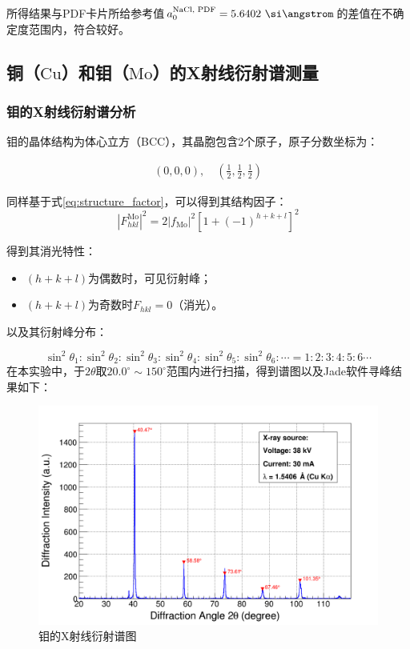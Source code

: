 \documentclass{thuemp}
\begin{document}
所得结果与PDF卡片所给参考值$a_0^{\text{NaCl, PDF}} = 5.6402~\text{\si\angstrom}$的差值在不确定度范围内，符合较好。

\subsection{铜（$\text{Cu}$）和钼（$\text{Mo}$）的X射线衍射谱测量}

\subsubsection{钼的X射线衍射谱分析}

钼的晶体结构为体心立方（BCC），其晶胞包含2个原子，原子分数坐标为：

\begin{align*}
(0,0,0),\quad \left(\frac{1}{2},\frac{1}{2},\frac{1}{2}\right)
\end{align*}

同样基于式\ref{eq:structure_factor}，可以得到其结构因子：
\begin{equation}
    |F_{hkl}^{\text{Mo}}|^2 = 2|f_{\text{Mo}}|^2 \left[1+(-1)^{h+k+l}\right]^2
    \label{eq:mo_struct_fac}
\end{equation}

得到其消光特性：

\begin{itemize}
    \item $(h+k+l)$为偶数时，可见衍射峰；
    \item $(h+k+l)$为奇数时$F_{hkl}=0$（消光）。
\end{itemize}

以及其衍射峰分布：

\begin{equation}
    \sin^2\theta_1 : \sin^2\theta_2: \sin^2\theta_3 : \sin^2\theta_4 : \sin^2\theta_5 : \sin^2\theta_6 : \cdots =
    1 : 2 : 3 : 4 : 5 : 6 \cdots
    \label{eq:mo_diff_patt}
\end{equation}
在本实验中，于$2\theta$取$20.0^\circ \sim 150^\circ$范围内进行扫描，得到谱图以及Jade软件寻峰结果如下：

\begin{figure}[H]
    \centering
    \includegraphics[width=0.8\linewidth]{../Data/Mo-multi.png}
    \caption{钼的X射线衍射谱图}
    \label{fig:mo_xrd}
\end{figure}
\end{document}
